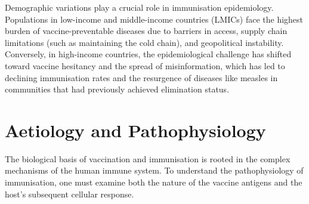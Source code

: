 Demographic variations play a crucial role in immunisation epidemiology. Populations in low-income and middle-income countries (LMICs) face the highest burden of vaccine-preventable diseases due to barriers in access, supply chain limitations (such as maintaining the cold chain), and geopolitical instability. Conversely, in high-income countries, the epidemiological challenge has shifted toward vaccine hesitancy and the spread of misinformation, which has led to declining immunisation rates and the resurgence of diseases like measles in communities that had previously achieved elimination status.

\section*{Aetiology and Pathophysiology}
The biological basis of vaccination and immunisation is rooted in the complex mechanisms of the human immune system. To understand the pathophysiology of immunisation, one must examine both the nature of the vaccine antigens and the host's subsequent cellular response.

